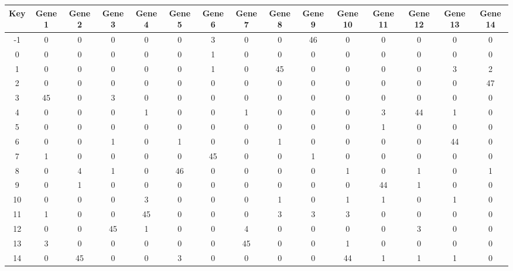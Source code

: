 \begin{tabular}{|c|c|c|c|c|c|c|c|c|c|c|c|c|c|c|}
\hline
Key & Gene 1 & Gene 2 & Gene 3 & Gene 4 & Gene 5 & Gene 6 & Gene 7 & Gene 8 & Gene 9 & Gene 10 & Gene 11 & Gene 12 & Gene 13 & Gene 14 \\
\hline
-1 & 0 & 0 & 0 & 0 & 0 & 3 & 0 & 0 & 46 & 0 & 0 & 0 & 0 & 0 \\
0 & 0 & 0 & 0 & 0 & 0 & 1 & 0 & 0 & 0 & 0 & 0 & 0 & 0 & 0 \\
1 & 0 & 0 & 0 & 0 & 0 & 1 & 0 & 45 & 0 & 0 & 0 & 0 & 3 & 2 \\
2 & 0 & 0 & 0 & 0 & 0 & 0 & 0 & 0 & 0 & 0 & 0 & 0 & 0 & 47 \\
3 & 45 & 0 & 3 & 0 & 0 & 0 & 0 & 0 & 0 & 0 & 0 & 0 & 0 & 0 \\
4 & 0 & 0 & 0 & 1 & 0 & 0 & 1 & 0 & 0 & 0 & 3 & 44 & 1 & 0 \\
5 & 0 & 0 & 0 & 0 & 0 & 0 & 0 & 0 & 0 & 0 & 1 & 0 & 0 & 0 \\
6 & 0 & 0 & 1 & 0 & 1 & 0 & 0 & 1 & 0 & 0 & 0 & 0 & 44 & 0 \\
7 & 1 & 0 & 0 & 0 & 0 & 45 & 0 & 0 & 1 & 0 & 0 & 0 & 0 & 0 \\
8 & 0 & 4 & 1 & 0 & 46 & 0 & 0 & 0 & 0 & 1 & 0 & 1 & 0 & 1 \\
9 & 0 & 1 & 0 & 0 & 0 & 0 & 0 & 0 & 0 & 0 & 44 & 1 & 0 & 0 \\
10 & 0 & 0 & 0 & 3 & 0 & 0 & 0 & 1 & 0 & 1 & 1 & 0 & 1 & 0 \\
11 & 1 & 0 & 0 & 45 & 0 & 0 & 0 & 3 & 3 & 3 & 0 & 0 & 0 & 0 \\
12 & 0 & 0 & 45 & 1 & 0 & 0 & 4 & 0 & 0 & 0 & 0 & 3 & 0 & 0 \\
13 & 3 & 0 & 0 & 0 & 0 & 0 & 45 & 0 & 0 & 1 & 0 & 0 & 0 & 0 \\
14 & 0 & 45 & 0 & 0 & 3 & 0 & 0 & 0 & 0 & 44 & 1 & 1 & 1 & 0 \\
\hline
\end{tabular}